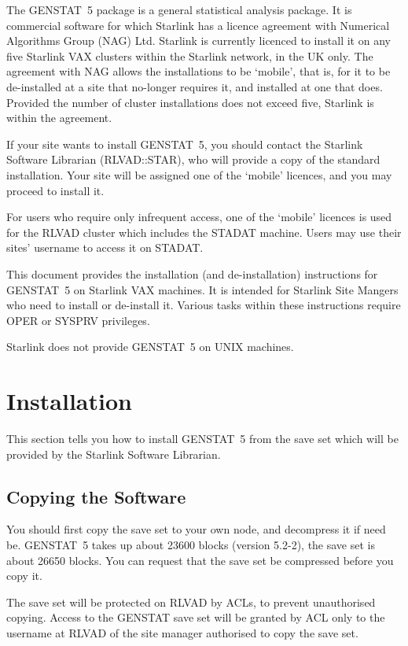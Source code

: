 The GENSTAT~5 package is a general statistical analysis package. It is
commercial software for which Starlink has a licence agreement with Numerical
Algorithms Group (NAG) Ltd. Starlink is currently licenced to install it on any
five Starlink VAX clusters within the Starlink network, in the UK only. The
agreement with NAG allows the installations to be `mobile', that is, for it to
be de-installed at a site that no-longer requires it, and installed at one that
does. Provided the number of cluster installations does not exceed five,
Starlink is within the agreement.

If your site wants to install GENSTAT~5, you should contact the Starlink
Software Librarian (RLVAD::STAR), who will provide a copy of the standard
installation. Your site will be assigned one of the `mobile' licences, and you
may proceed to install it. 

For users who require only infrequent access, one of the `mobile' licences is
used for the RLVAD cluster which includes the STADAT machine. Users  may use
their sites' username to access it on STADAT. 

This document provides the installation (and de-installation) instructions for
GENSTAT~5 on Starlink VAX machines. It is intended for Starlink Site Mangers
who need to install or de-install it. Various tasks within these instructions
require OPER or SYSPRV privileges.

Starlink does not provide GENSTAT~5 on UNIX machines. 

\section{Installation}

This section tells you how to install GENSTAT~5 from the save set which will be
provided by the Starlink Software Librarian. 

\subsection{Copying the Software}

You should first copy the save set to your own node, and decompress it if need
be. GENSTAT~5 takes up about 23600 blocks (version 5.2-2), the save set is
about 26650 blocks. You can request that the save set be compressed before you
copy it.

The save set will be protected on RLVAD by ACLs, to prevent unauthorised
copying. Access to the GENSTAT save set will be granted by ACL only to the
username at RLVAD of the site manager authorised to copy the save set.

